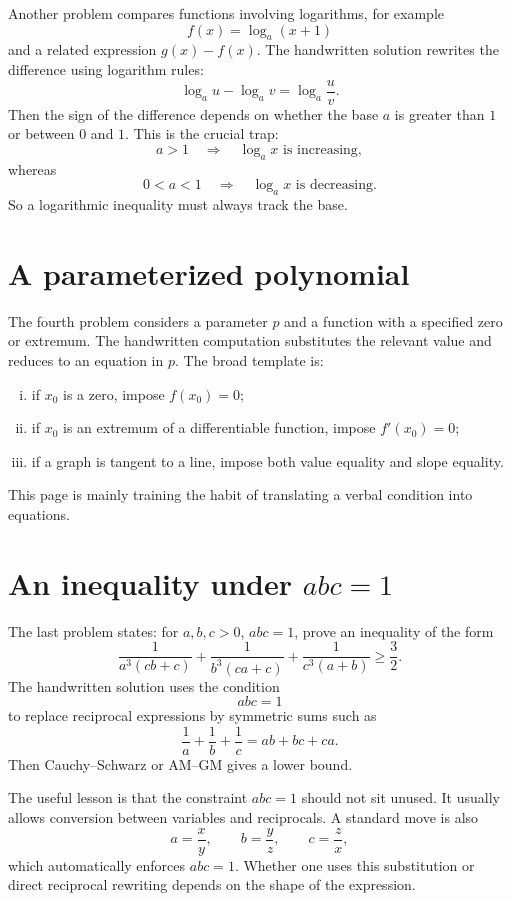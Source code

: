 Another problem compares functions involving logarithms, for example
\[
  f(x)=\log_a(x+1)
\]
and a related expression \(g(x)-f(x)\).  The handwritten solution rewrites the difference using logarithm rules:
\[
  \log_a u-\log_a v=\log_a\frac uv.
\]
Then the sign of the difference depends on whether the base \(a\) is greater than \(1\) or between \(0\) and \(1\).  This is the crucial trap:
\[
  a>1\quad\Rightarrow\quad \log_a x\text{ is increasing},
\]
whereas
\[
  0<a<1\quad\Rightarrow\quad \log_a x\text{ is decreasing}.
\]
So a logarithmic inequality must always track the base.

\section{A parameterized polynomial}

The fourth problem considers a parameter \(p\) and a function with a specified zero or extremum.  The handwritten computation substitutes the relevant value and reduces to an equation in \(p\).  The broad template is:
\begin{enumerate}[(i)]
  \item if \(x_0\) is a zero, impose \(f(x_0)=0\);
  \item if \(x_0\) is an extremum of a differentiable function, impose \(f'(x_0)=0\);
  \item if a graph is tangent to a line, impose both value equality and slope equality.

\end{enumerate}

This page is mainly training the habit of translating a verbal condition into equations.

\section[An inequality under abc=1]{An inequality under \(abc=1\)}

The last problem states: for \(a,b,c>0\), \(abc=1\), prove an inequality of the form
\[
  \frac1{a^3(cb+c)}+\frac1{b^3(ca+c)}+\frac1{c^3(a+b)}\ge\frac32.
\]
The handwritten solution uses the condition
\[
  abc=1
\]
to replace reciprocal expressions by symmetric sums such as
\[
  \frac1a+\frac1b+\frac1c=ab+bc+ca.
\]
Then Cauchy--Schwarz or AM--GM gives a lower bound.

The useful lesson is that the constraint \(abc=1\) should not sit unused.  It usually allows conversion between variables and reciprocals.  A standard move is also
\[
  a=\frac xy,\qquad b=\frac yz,\qquad c=\frac zx,
\]
which automatically enforces \(abc=1\).  Whether one uses this substitution or direct reciprocal rewriting depends on the shape of the expression.

